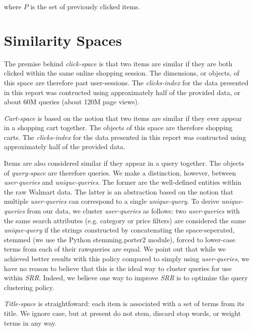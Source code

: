 \documentclass{article}
\begin{document}
where $P$ is the set of previously clicked items. 

\section{Similarity Spaces}\label{sec:similarity_spaces}

The premise behind {\em click-space} is that two items are similar if they are
both clicked within the same online shopping session. The dimensions, or
objects, of this space are therefore past user-sessions. The {\em clicks-index}
for the data presented in this report was contructed using approximately half of
the provided data, or about 60M queries (about 120M page views).

{\em Cart-space} is based on the notion that two items are similar if they ever
appear in a shopping cart together. The objects of this space are therefore
shopping carts. The {\em clicks-index} for the data presented in this report was
contructed using approximately half of the provided data.

Items are also considered similar if they appear in a query together. The
objects of {\em query-space} are therefore queries. We make a distinction,
however, between {\em user-queries} and {\em unique-queries}. The former are the
well-defined entities within the raw Walmart data. The latter is an abstraction
based on the notion that multiple {\em user-queries} can correspond to a single
{\em unique-query}. To derive {\em unique-queries} from our data, we cluster
{\em user-queries} as follows: two {\em user-queries} with the same search
attributes (e.g. category or price filters) are considered the same {\em
unique-query} if the strings constructed by concatenating the space-seperated,
stemmed (we use the Python stemming.porter2 module), forced to lower-case terms
from each of their rawqueries are equal. We point out that while we achieved
better results with this policy compared to simply using {\em user-queries}, we
have no reason to believe that this is the ideal way to cluster queries for use
within {\em SRR}. Indeed, we believe one way to improve {\em SRR} is to optimize 
the query clustering policy.

{\em Title-space} is straightfoward: each item is associated with a set of terms
from its title. We ignore case, but at present do not stem, discard stop words,
or weight terms in any way. 
\end{document}
